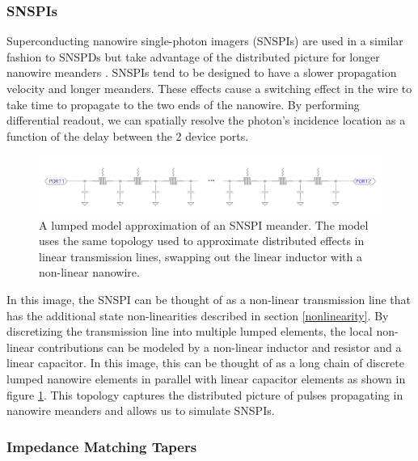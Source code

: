 \subsubsection{SNSPIs} \label{snspi_intro}

Superconducting nanowire single-photon imagers (SNSPIs) are used in a similar fashion
to SNSPDs but take advantage of the distributed picture for longer nanowire meanders
 \cite{snspi_paper}.
SNSPIs tend to be designed to have a slower propagation velocity and longer meanders.
These effects cause a switching effect in the wire to take time to propagate to the two 
ends of the nanowire. By performing differential readout, we can spatially resolve
the photon's incidence location as a function of the delay between the 2 device ports.

\begin{figure}
    \centering
    \includegraphics[width=\textwidth]{figs/snspi_meander.png}
    \caption{A lumped model approximation of an SNSPI meander. The model uses the same
    topology used to approximate distributed effects in linear transmission lines,
    swapping out the linear inductor with a non-linear nanowire.}
    \label{fig:snspi_tline}
\end{figure}

In this image, the SNSPI can be thought of as a non-linear transmission line that
has the additional state non-linearities described in section \ref{nonlinearity}. By discretizing the transmission line
into multiple lumped elements, the local non-linear contributions can be modeled by a
non-linear inductor and resistor and a linear capacitor. In this image,
this can be thought of as a long chain of discrete lumped nanowire elements in parallel
with linear capacitor elements as shown in figure \ref{fig:snspi_tline}. This topology captures the distributed picture of
pulses propagating in nanowire meanders and allows us to simulate SNSPIs.

\subsubsection{Impedance Matching Tapers} \label{tapers_intro}

